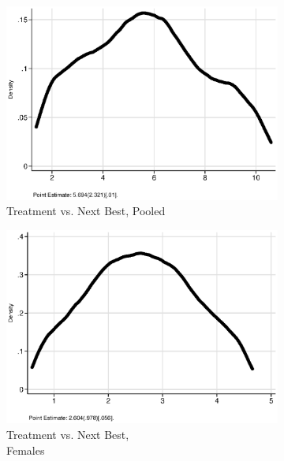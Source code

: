 \begin{figure}
\centering
\caption{Benefit/Cost Ratios, by Gender and by Parameter}\label{figure:ratiodist}
\begin{subfigure}[h]{0.25\textwidth}
		\centering
		\caption{Treatment vs. Next Best, Pooled}
		\includegraphics[width=\textwidth]{output/ratios_2_sexp.eps}
\end{subfigure}%
\begin{subfigure}[h]{0.25\textwidth}
	\centering
	\caption{Treatment vs. Next Best,\\ Females}
		\includegraphics[width=\textwidth]{output/ratios_2_sexf.eps}
\end{subfigure}%
\begin{subfigure}[h]{0.25\textwidth}

\end{subfigure}
\end{figure}
